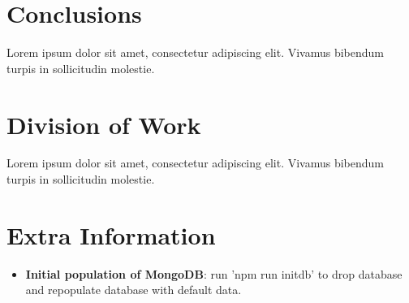 \documentclass[11pt, a4paper]{article}
\begin{document}
\section{Conclusions}
Lorem ipsum dolor sit amet, consectetur adipiscing elit. Vivamus bibendum turpis in sollicitudin
molestie.

\section{Division of Work}
Lorem ipsum dolor sit amet, consectetur adipiscing elit. Vivamus bibendum turpis in sollicitudin
molestie.

\section{Extra Information}
\begin{itemize}
  \item \textbf{Initial population of MongoDB}: run 'npm run initdb' to drop database and
  repopulate database with default data.
\end{itemize}
\end{document}
